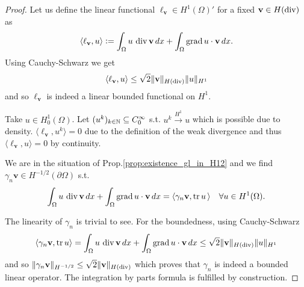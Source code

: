 \documentclass[../master_thesis.tex]{subfiles}
\begin{document}
\begin{proof}
    Let us define 
    the linear functional $\ell_\mathbf{v} \in H^1(\Omega)'$ for a fixed $\mathbf{v} \in H(\operatorname{div})$
    as
    \begin{align*}
        \langle \ell_\mathbf{v}, u \rangle \vcentcolon= \int_\Omega u \, \operatorname{div} \mathbf{v} \, dx 
         + \int_\Omega \operatorname{grad} u \cdot \mathbf{v} \, dx.
    \end{align*}
    Using Cauchy-Schwarz we get
    \begin{align*}
        \langle \ell_\mathbf{v}, u \rangle 
        \leq \sqrt{2} \lVert \mathbf{v} \rVert _{H(\operatorname{div})} \lVert u \rVert _{H^1} 
    \end{align*}
    and so $\ell_\mathbf{v}$ is indeed a linear bounded functional on $H^1$.
    
    Take $u \in H^1_0(\Omega)$. 
    Let $(u^k)_{k\in \mathbb{N}} \subseteq C^\infty_0$ s.t. 
    $u^k \xrightarrow{H^1} u$ which is possible due to density. 
    $\langle \ell_\mathbf{v}, u^k \rangle  = 0$  due to the 
    definition of the weak divergence and thus $\langle \ell_\mathbf{v}, u \rangle = 0$
    by continuity.

    We are in the situation of Prop.\ref{prop:existence_gl_in_H12} 
    and we find $\gamma_n \mathbf{v} \in H^{-1/2}(\partial \Omega)$ 
    s.t. 
    \begin{align*}
        \int_\Omega u \, \operatorname{div} \mathbf{v} \, dx 
        + \int_\Omega \operatorname{grad} u \cdot \mathbf{v} \, dx 
        = \langle \gamma_n \mathbf{v}, \operatorname{tr} u \, \rangle \quad \forall u \in H^1(\Omega).
    \end{align*}
    
    The linearity of $\gamma_n$ is trivial to see.
    For the boundedness, using Cauchy-Schwarz 
    \begin{align*}
        \langle \gamma_n \mathbf{v}, \operatorname{tr} u \rangle 
        = \int_\Omega u \, \operatorname{div} \mathbf{v} \, dx 
            + \int_\Omega \operatorname{grad} u \cdot \mathbf{v} \, dx
        \leq \sqrt{2} \lVert \mathbf{v} \rVert _{H(\operatorname{div})} \lVert u \rVert _{H^1}
    \end{align*}
    and so $\lVert \gamma_n \mathbf{v} \rVert _{H^{-1/2}} \leq \sqrt{2}\lVert \mathbf{v} \rVert _{H(\operatorname{div})}$
    which proves that $\gamma_n$ is indeed a bounded linear operator. The integration
    by parts formula is fulfilled by construction. 


\end{proof}
\end{document}
